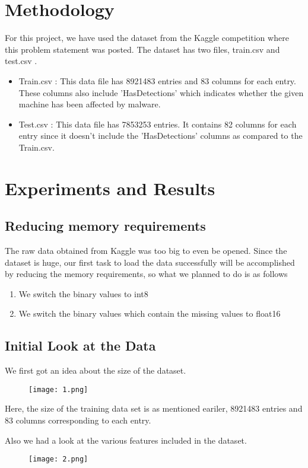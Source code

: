 \documentclass[conference]{IEEEtran}
\begin{document}
\section{Methodology}
For this project, we have used the dataset from the Kaggle competition where this problem statement was posted. The dataset has two files, train.csv and test.csv .
\begin{itemize}
    \item Train.csv : This data file has 8921483 entries and 83 columns for each entry.
          These columns also include 'HasDetections' which indicates whether the given machine has been affected by malware.
    \item Test.csv : This data file has 7853253 entries. It contains 82 columns for each entry since it doesn't include the 'HasDetections' columns as compared to the Train.csv.
\end{itemize}

\section{Experiments and Results}
\subsection{Reducing memory requirements}
The raw data obtained from Kaggle was too big to even be opened. Since the dataset is huge, our first task to load the data successfully will be accomplished by reducing the memory requirements, so what we planned to do is as follows
\begin{enumerate}
    \item We switch the binary values to int8
    \item We switch the binary values which contain the missing values to float16
\end{enumerate}

\subsection{Initial Look at the Data}
We first got an idea about the size of the dataset.
\begin{figure}[H]
    \centering
    \texttt{[image: 1.png]}
\end{figure}
Here, the size of the training data set is as mentioned eariler, 8921483 entries and 83 columns corresponding to each entry.

Also we had a look at the various features included in the dataset.
\begin{figure}[H]
    \centering
    \texttt{[image: 2.png]}
\end{figure}
\end{document}
